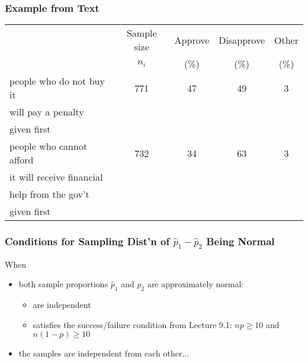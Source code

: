 \documentclass[handout]{beamer}
\newcommand{\blue}[1]{\textcolor{blue2}{#1}}
\newcommand{\phat}{\widehat{p}}
\begin{document}
\begin{frame}[fragile]
\frametitle{Example from Text}

\begin{small}
\begin{center}
  \begin{tabular}{l|cccc}
     & Sample size & Approve & Disapprove & Other \\ 
     &  $n_i$ & (\%) & (\%) &  (\%)\\   
  \hline
    \blue{people who do not buy it}   & 771 & 47 & 49 & 3 \\ 
    \blue{will pay a penalty}  & &  &  &  \\ 
    given first & &  &  &  \\     
    \hline
    \blue{people who cannot afford} & 732 & 34 & 63 & 3 \\ 
    \blue{it will receive financial}  & & & &  \\ 
    \blue{help from the gov't} & & & &  \\ 
    given first & & & &  \\    
   \end{tabular}
\end{center}
\end{small}

\end{frame}


\begin{frame}[fragile]
\frametitle{Conditions for Sampling Dist'n of $\phat_1-\phat_2$ Being Normal}

When
\begin{itemize}
\pause\item both sample proportions $\widehat{p}_1$ and $\widehat{p}_2$ are approximately \blue{normal}:
\begin{itemize}
\item are independent
\item satisfies the success/failure condition from Lecture 9.1:  $np \geq 10$ and $n(1-p) \geq 10$
\end{itemize}
\pause\item the samples are independent from each other...
\end{itemize}

\end{frame}
\end{document}
